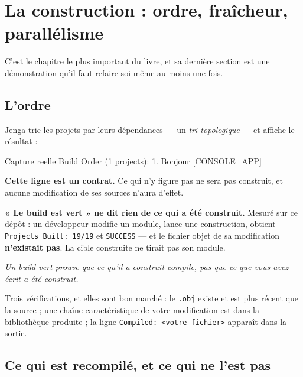 \chapter{La construction : ordre, fraîcheur, parallélisme}

C'est le chapitre le plus important du livre, et sa dernière section est une
démonstration qu'il faut refaire soi-même au moins une fois.

\section{L'ordre}

\begin{nkretenir}
Jenga trie les projets par leurs dépendances --- un \emph{tri topologique} --- et
affiche le résultat :

\begin{nkcode}{Capture reelle}
Build Order (1 projects):
  1. Bonjour [CONSOLE_APP]
\end{nkcode}

\textbf{Cette ligne est un contrat.} Ce qui n'y figure pas ne sera pas construit,
et aucune modification de ses sources n'aura d'effet.
\end{nkretenir}

\begin{nkpiege}
\textbf{« Le build est vert » ne dit rien de ce qui a été construit.} Mesuré sur
ce dépôt : un développeur modifie un module, lance une construction, obtient
\texttt{Projects Built: 19/19} et \texttt{SUCCESS} --- et le fichier objet de sa
modification \textbf{n'existait pas}. La cible construite ne tirait pas son
module.

\emph{Un build vert prouve que ce qu'il a construit compile, pas que ce que vous
avez écrit a été construit.}

Trois vérifications, et elles sont bon marché : le \texttt{.obj} existe et est
plus récent que la source ; une chaîne caractéristique de votre modification est
dans la bibliothèque produite ; la ligne \texttt{Compiled: <votre fichier>}
apparaît dans la sortie.
\end{nkpiege}

\section{Ce qui est recompilé, et ce qui ne l'est pas}

